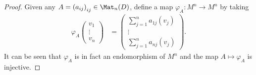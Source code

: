 \documentclass[10pt]{mypackage}
\begin{document}
\begin{proof}
  Given any $A = \left( a_{ij} \right)_{ij}\in \Mat_n(D)$, define a map $\varphi_A\colon M^{n}\rightarrow M^{n}$ by taking
  \begin{align*}
    \varphi_A \begin{pmatrix}v_1\\\vdots\\v_n\end{pmatrix} &= \begin{pmatrix}\sum_{j=1}^{n}a_{1j}\left(v_j\right) \\ \vdots \\ \sum_{j=1}^{n}a_{nj}\left(v_j\right)\end{pmatrix}.
  \end{align*}
  It can be seen that $\varphi_A$ is in fact an endomorphism of $M^{n}$ and the map $A\mapsto \varphi_A$ is injective. 


\end{proof}
\end{document}

